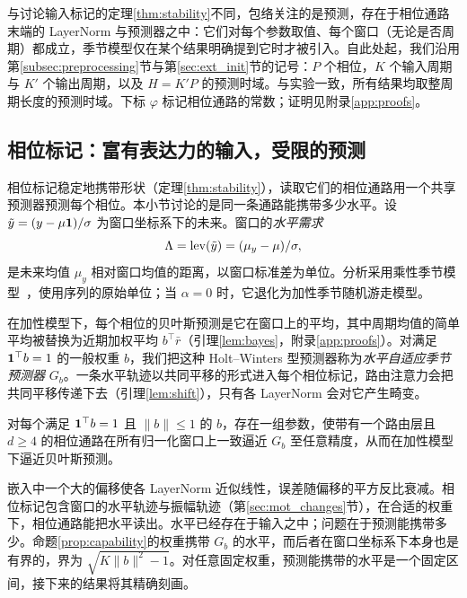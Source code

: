 {
与讨论输入标记的定理\ref{thm:stability}不同，包络关注的是预测，存在于相位通路末端的 LayerNorm 与预测器之中：它们对每个参数取值、每个窗口（无论是否周期）都成立，季节模型仅在某个结果明确提到它时才被引入。自此处起，我们沿用第\ref{subsec:preprocessing}节与第\ref{sec:ext_init}节的记号：$P$ 个相位，$K$ 个输入周期与 $K'$ 个输出周期，以及 $H=K'P$ 的预测时域。与实验一致，所有结果均取整周期长度的预测时域。下标 $\varphi$ 标记相位通路的常数；证明见附录\ref{app:proofs}。

\subsection{相位标记：富有表达力的输入，受限的预测}
\label{sec:theory_setup}

相位标记稳定地携带形状（定理\ref{thm:stability}），读取它们的相位通路用一个共享预测器预测每个相位。本小节讨论的是同一条通路能携带多少水平。设 $\tilde y=(y-\mu\mathbf 1)/\sigma$ 为窗口坐标系下的未来。窗口的\emph{水平需求}
\begin{equation}
\Lambda=\operatorname{lev}(\tilde y)=(\mu_y-\mu)/\sigma,
\label{eq:level_demand}
\end{equation}
是未来均值 $\mu_y$ 相对窗口均值的距离，以窗口标准差为单位。分析采用乘性季节模型~，使用序列的原始单位；当 $\alpha=0$ 时，它退化为加性季节随机游走模型。

在加性模型下，每个相位的贝叶斯预测是它在窗口上的平均，其中周期均值的简单平均被替换为近期加权平均 $b^\top\bar r$（引理\ref{lem:bayes}，附录\ref{app:proofs}）。对满足 $\mathbf 1^\top b=1$ 的一般权重 $b$，我们把这种 Holt--Winters 型预测器称为\emph{水平自适应季节预测器} $G_b$。一条水平轨迹以共同平移的形式进入每个相位标记，路由注意力会把共同平移传递下去（引理\ref{lem:shift}），只有各 LayerNorm 会对它产生畸变。

\begin{proposition}[结构的水平能力]
\label{prop:capability}
对每个满足 $\mathbf 1^\top b=1$ 且 $\|b\|\le1$ 的 $b$，存在一组参数，使带有一个路由层且 $d\ge4$ 的相位通路在所有归一化窗口上一致逼近 $G_b$ 至任意精度，从而在加性模型下逼近贝叶斯预测。
\end{proposition}

嵌入中一个大的偏移使各 LayerNorm 近似线性，误差随偏移的平方反比衰减。相位标记包含窗口的水平轨迹与振幅轨迹（第\ref{sec:mot_changes}节），在合适的权重下，相位通路能把水平读出。水平已经存在于输入之中；问题在于预测能携带多少。命题\ref{prop:capability}的权重携带 $G_b$ 的水平，而后者在窗口坐标系下本身也是有界的，界为 $\sqrt{K\|b\|^2-1}$。对任意固定权重，预测能携带的水平是一个固定区间，接下来的结果将其精确刻画。

}
